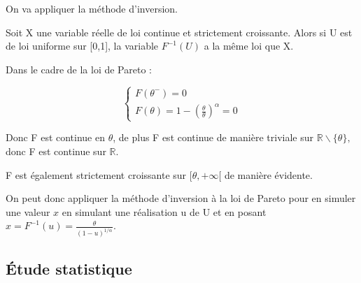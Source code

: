 \documentclass{article}
\begin{document}
On va appliquer la méthode d'inversion. 

Soit X une variable réelle de loi continue et strictement croissante.
Alors si U est de loi uniforme sur {[}0,1{]}, la variable $F^{-1}(U)$
a la même loi que X.

Dans le cadre de la loi de Pareto :

\[
\begin{cases}
F(\theta^{-})=0\\
F(\theta)=1-(\frac{\theta}{\theta})^{\alpha}=0
\end{cases}
\]

Donc F est continue en $\theta$, de plus F est continue de manière
triviale sur $\mathbb{R}\backslash\{\theta\},$donc F est continue
sur $\mathbb{R}$.

F est également strictement croissante sur $[\theta,+\infty[$ de
manière évidente.

On peut donc appliquer la méthode d'inversion à la loi de Pareto pour
en simuler une valeur $x$ en simulant une réalisation u de U et en
posant $x=F^{-1}(u)=\frac{\theta}{(1-u)^{1/\alpha}}$.

\subsection{Étude statistique}
\end{document}

